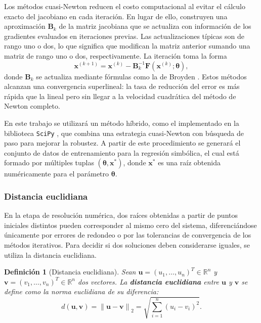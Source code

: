 \documentclass[12pt,a4paper]{article} \usepackage[utf8]{inputenc} \usepackage[spanish]{babel} \usepackage{amsmath, amssymb, amsthm} \usepackage{bm} \usepackage{float} \usepackage{longtable} \usepackage[hidelinks]{hyperref}
\newtheorem{definition}{Definición} \newtheorem{theorem}{Teorema} \newtheorem{remark}{Observación} \newcounter{pseudocode}
\newcommand{\xvec}{\mathbf{x}} \newcommand{\thetavec}{\boldsymbol{\theta}} \newcommand{\Fvec}{\mathbf{F}} \newcommand{\R}{\mathbb{R}} \newcommand{\norm}[1]{\left\lVert#1\right\rVert} \newcommand{\loss}{\mathcal{L}} \newcommand{\dataset}{\mathcal{D}} \newcommand{\jac}{\mathbf{J}}
\begin{document}
Los métodos cuasi-Newton \cite{nocedal2006numerical} reducen el costo computacional al evitar el cálculo exacto del jacobiano en cada iteración. En lugar de ello, construyen una aproximación \(\mathbf{B}_k\) de la matriz jacobiana que se actualiza con información de los gradientes evaluados en iteraciones previas. Las actualizaciones típicas son de rango uno o dos, lo que significa que modifican la matriz anterior sumando una matriz de rango uno o dos, respectivamente. La iteración toma la forma \[ \xvec^{(k+1)} = \xvec^{(k)} - \mathbf{B}_k^{-1} \Fvec(\xvec^{(k)}; \thetavec), \] donde \(\mathbf{B}_k\) se actualiza mediante fórmulas como la de Broyden \cite{broyden1965class}. Estos métodos alcanzan una convergencia superlineal: la tasa de reducción del error es más rápida que la lineal pero sin llegar a la velocidad cuadrática del método de Newton completo.

En este trabajo se utilizará un método híbrido, como el implementado en la biblioteca \texttt{SciPy} \cite{virtanen2020scipy}, que combina una estrategia cuasi-Newton con búsqueda de paso para mejorar la robustez. A partir de este procedimiento se generará el conjunto de datos de entrenamiento para la regresión simbólica, el cual está formado por múltiples tuplas \((\thetavec, \xvec^*)\), donde \(\xvec^*\) es una raíz obtenida numéricamente para el parámetro \(\thetavec\).

\subsubsection{Distancia euclidiana}

En la etapa de resolución numérica, dos raíces obtenidas a partir de puntos iniciales distintos pueden corresponder al mismo cero del sistema, diferenciándose únicamente por errores de redondeo o por las tolerancias de convergencia de los métodos iterativos. Para decidir si dos soluciones deben considerarse iguales, se utiliza la distancia euclidiana.

\begin{definition}[Distancia euclidiana]
Sean \(\mathbf{u} = (u_1, \dots, u_n)^T \in \R^n\) y \(\mathbf{v} = (v_1, \dots, v_n)^T \in \R^n\) dos vectores. La \textbf{distancia euclidiana} entre \(\mathbf{u}\) y \(\mathbf{v}\) se define como la norma euclidiana de su diferencia:
\begin{equation}
d(\mathbf{u}, \mathbf{v}) = \norm{\mathbf{u} - \mathbf{v}}_2 = \sqrt{\sum_{i=1}^{n} (u_i - v_i)^2}.
\end{equation}
\end{definition}
\end{document}
